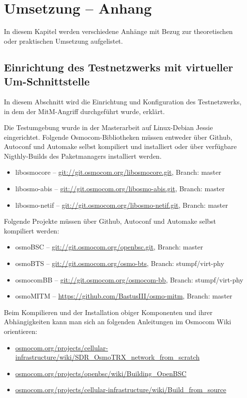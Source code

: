 \chapter{Umsetzung -- Anhang}
In diesem Kapitel werden verschiedene Anhänge mit Bezug zur theoretischen oder praktischen Umsetzung aufgelistet.

\section{Einrichtung des Testnetzwerks mit virtueller Um-Schnittstelle}\label{hdl:a_einrichtung_testumgebung}

In diesem Abschnitt wird die Einrichtung und Konfiguration des Testnetzwerks, in dem der \ac{MitM}-Angriff durchgeführt wurde, erklärt.

Die Testumgebung wurde in der Masterarbeit auf Linux-Debian Jessie eingerichtet. Folgende Osmocom-Bibliotheken müssen entweder über Github, Autoconf und Automake selbst kompiliert und installiert oder über verfügbare Nigthly-Builds des Paketmanagers installiert werden.
\begin{itemize}
\item libosmocore -- \url{git://git.osmocom.org/libosmocore.git}, Branch: master
\item libosmo-abis -- \url{git://git.osmocom.org/libosmo-abis.git}, Branch: master
\item libosmo-netif -- \url{git://git.osmocom.org/libosmo-netif.git}, Branch: master
\end{itemize}
Folgende Projekte müssen über Github, Autoconf und Automake selbst kompiliert werden:
\begin{itemize}
\item osmoBSC -- \url{git://git.osmocom.org/openbsc.git}, Branch: master
\item osmoBTS -- \url{git://git.osmocom.org/osmo-bts}, Branch: stumpf/virt-phy
\item osmocomBB -- \url{git://git.osmocom.org/osmocom-bb}, Branch: stumpf/virt-phy
\item osmoMITM -- \url{https://github.com/BastusIII/osmo-mitm}, Branch: master
\end{itemize}
Beim Kompilieren und der Installation obiger Komponenten und ihrer Abhängigkeiten kann man sich an folgenden Anleitungen im Osmocom Wiki orientieren:
\begin{itemize}
\item \url{osmocom.org/projects/cellular-infrastructure/wiki/SDR_OsmoTRX_network_from_scratch}
\item \url{osmocom.org/projects/openbsc/wiki/Building_OpenBSC}
\item \url{osmocom.org/projects/cellular-infrastructure/wiki/Build_from_source}
\end{itemize}

